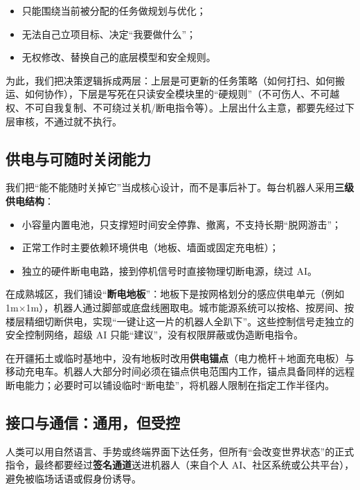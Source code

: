 \begin{itemize}
\item
  只能围绕当前被分配的任务做规划与优化；
\item
  无法自己立项目标、决定``我要做什么''；
\item
  无权修改、替换自己的底层模型和安全规则。
\end{itemize}

为此，我们把决策逻辑拆成两层：上层是可更新的任务策略（如何打扫、如何搬运、如何协作），下层是写死在只读安全模块里的``硬规则''（不可伤人、不可越权、不可自我复制、不可绕过关机/断电指令等）。上层出什么主意，都要先经过下层审核，不通过就不执行。

\subsection{供电与可随时关闭能力}\label{ux4f9bux7535ux4e0eux53efux968fux65f6ux5173ux95edux80fdux529b}

我们把``能不能随时关掉它''当成核心设计，而不是事后补丁。每台机器人采用\textbf{三级供电结构}：

\begin{itemize}
\item
  小容量内置电池，只支撑短时间安全停靠、撤离，不支持长期``脱网游击''；
\item
  正常工作时主要依赖环境供电（地板、墙面或固定充电桩）；
\item
  独立的硬件断电电路，接到停机信号时直接物理切断电源，绕过 AI。
\end{itemize}

在成熟城区，我们铺设``\textbf{断电地板}''：地板下是按网格划分的感应供电单元（例如 1m×1m），机器人通过脚部或底盘线圈取电。城市能源系统可以按格、按房间、按楼层精细切断供电，实现``一键让这一片的机器人全趴下''。这些控制信号走独立的安全控制网络，超级 AI 只能``建议''，没有权限屏蔽或伪造断电指令。

在开疆拓土或临时基地中，没有地板时改用\textbf{供电锚点}（电力桅杆＋地面充电板）与移动充电车。机器人大部分时间必须在锚点供电范围内工作，锚点具备同样的远程断电能力；必要时可以铺设临时``断电垫''，将机器人限制在指定工作半径内。

\subsection{接口与通信：通用，但受控}\label{ux63a5ux53e3ux4e0eux901aux4fe1ux901aux7528ux4f46ux53d7ux63a7}

人类可以用自然语言、手势或终端界面下达任务，但所有``会改变世界状态''的正式指令，最终都要经过\textbf{签名通道}送进机器人（来自个人 AI、社区系统或公共平台），避免被临场话语或假身份诱导。

